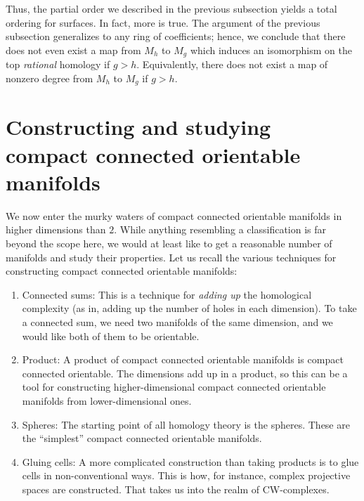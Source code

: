 \documentclass[a4paper]{amsart}
\begin{document}
Thus, the partial order we described in the previous subsection yields
a total ordering for surfaces. In fact, more is true. The argument of
the previous subsection generalizes to any ring of coefficients;
hence, we conclude that there does not even exist a map from $M_h$ to
$M_g$ which induces an isomorphism on the top {\em rational} homology
if $g > h$. Equivalently, there does not exist a map of nonzero degree
from $M_h$ to $M_g$ if $g > h$.

\section{Constructing and studying compact connected orientable manifolds}

We now enter the murky waters of compact connected orientable
manifolds in higher dimensions than $2$. While anything resembling a
classification is far beyond the scope here, we would at least like to
get a reasonable number of manifolds and study their properties. Let
us recall the various techniques for constructing compact connected
orientable manifolds:

\begin{enumerate}

\item Connected sums: This is a technique for {\em adding up} the
  homological complexity (as in, adding up the number of holes in each
  dimension). To take a connected sum, we need two manifolds of the
  same dimension, and we would like both of them to be orientable.

\item Product: A product of compact connected orientable manifolds is
  compact connected orientable. The dimensions add up in a product, so
  this can be a tool for constructing higher-dimensional compact
  connected orientable manifolds from lower-dimensional ones.

\item Spheres: The starting point of all homology theory is the
  spheres. These are the ``simplest'' compact connected orientable
  manifolds.

\item Gluing cells: A more complicated construction than taking
  products is to glue cells in non-conventional ways. This is how, for
  instance, complex projective spaces are constructed. That takes us
  into the realm of CW-complexes.

\end{enumerate}
\end{document}
